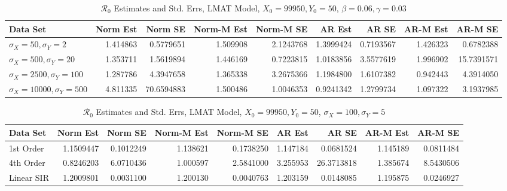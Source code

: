 \documentclass[12pt]{article}
\newcommand{\rr}{\ensuremath{\mathcal{R}_0}}
\begin{document}
\begin{table}[H]
	
	\caption{\label{tab:}$\rr$ Estimates and Std. Errs, LMAT Model,
		$X_0 = 99950, Y_0 = 50$, $\beta = 0.06, \gamma = 0.03$}
	\centering
	\begin{footnotesize}
		\begin{tabular}[t]{l|r|r|r|r|r|r|r|r}
			\hline
			Data Set & Norm Est & Norm SE & Norm-M Est & Norm-M SE & AR Est & AR SE & AR-M Est & AR-M SE\\
			\hline
			$\sigma_X = 50, \sigma_Y = 2$ & 1.414863 & 0.5779651 & 1.509908 & 2.1243768 & 1.3999424 & 0.7193567 & 1.426323 & 0.6782388\\
			\hline
			$\sigma_X = 500, \sigma_Y = 20$ & 1.353711 & 1.5619894 & 1.446169 & 0.7223815 & 1.0183856 & 3.5577619 & 1.996902 & 15.7391571\\
			\hline
			$\sigma_X = 2500, \sigma_Y = 100$ & 1.287786 & 4.3947658 & 1.365338 & 3.2675366 & 1.1984800 & 1.6107382 & 0.942443 & 4.3914050\\
			\hline
			$\sigma_X = 10000, \sigma_Y = 500$ & 4.811335 & 70.6594883 & 1.500486 & 1.0046353 & 0.9241342 & 1.2799734 & 1.097322 & 3.1937985\\
			\hline
		\end{tabular}
	\end{footnotesize}
\end{table}

\begin{table}[H]
	
	\caption{\label{tab:}$\rr$ Estimates and Std. Errs, LMAT Model,
		$X_0 = 99950, Y_0 = 50$, $\sigma_X = 100, \sigma_Y = 5$}
	\centering
	\begin{footnotesize}
		\begin{tabular}[t]{l|r|r|r|r|r|r|r|r}
			\hline
			Data Set & Norm Est & Norm SE & Norm-M Est & Norm-M SE & AR Est & AR SE & AR-M Est & AR-M SE\\
			\hline
			1st Order & 1.1509447 & 0.1012249 & 1.138621 & 0.1738250 & 1.147184 & 0.0681524 & 1.145189 & 0.0811484\\
			\hline
			4th Order & 0.8246203 & 6.0710436 & 1.000597 & 2.5841000 & 3.255953 & 26.3713818 & 1.385674 & 8.5430506\\
			\hline
			Linear SIR & 1.2009801 & 0.0031100 & 1.200130 & 0.0040763 & 1.203159 & 0.0148085 & 1.195875 & 0.0246927\\
			\hline
		\end{tabular}
	\end{footnotesize}
\end{table}
\end{document}
